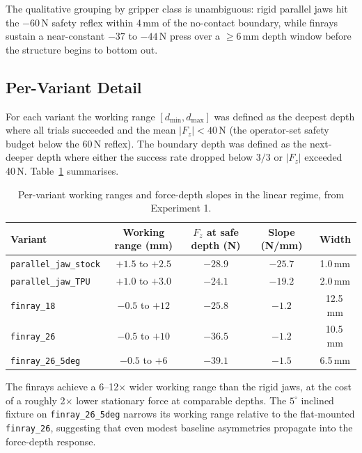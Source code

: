 The qualitative grouping by gripper class is unambiguous: rigid parallel
jaws hit the $-60$\,N safety reflex within 4\,mm of the no-contact boundary,
while finrays sustain a near-constant $-37$ to $-44$\,N press over a
$\geq 6$\,mm depth window before the structure begins to bottom out.

\subsection{Per-Variant Detail}

For each variant the working range $[d_{\min}, d_{\max}]$ was defined as the
deepest depth where all trials succeeded and the mean $|F_z| < 40$\,N (the
operator-set safety budget below the 60\,N reflex). The boundary depth
was defined as the next-deeper depth where either the success rate dropped
below $3/3$ or $|F_z|$ exceeded 40\,N. Table~\ref{tab:working-range}
summarises.

\begin{table}[ht]
\centering
\caption[Working ranges]{Per-variant working ranges and force-depth slopes
in the linear regime, from Experiment 1.}
\label{tab:working-range}
\begin{tabular}{lcccc}
\toprule
Variant & Working range (mm) & $F_z$ at safe depth (N) &
        Slope (N/mm) & Width \\
\midrule
\texttt{parallel\_jaw\_stock}   & $+1.5$ to $+2.5$ & $-28.9$ & $-25.7$ & 1.0\,mm \\
\texttt{parallel\_jaw\_TPU}     & $+1.0$ to $+3.0$ & $-24.1$ & $-19.2$ & 2.0\,mm \\
\texttt{finray\_18}             & $-0.5$ to $+12$  & $-25.8$ & $-1.2$  & 12.5\,mm \\
\texttt{finray\_26}             & $-0.5$ to $+10$  & $-36.5$ & $-1.2$  & 10.5\,mm \\
\texttt{finray\_26\_5deg}       & $-0.5$ to $+6$   & $-39.1$ & $-1.5$  & 6.5\,mm \\
\bottomrule
\end{tabular}
\end{table}

The finrays achieve a 6--12$\times$ wider working range than the rigid jaws,
at the cost of a roughly 2$\times$ lower stationary force at comparable
depths. The $5^{\circ}$ inclined fixture on \texttt{finray\_26\_5deg}
narrows its working range relative to the flat-mounted \texttt{finray\_26},
suggesting that even modest baseline asymmetries propagate into the
force-depth response.

